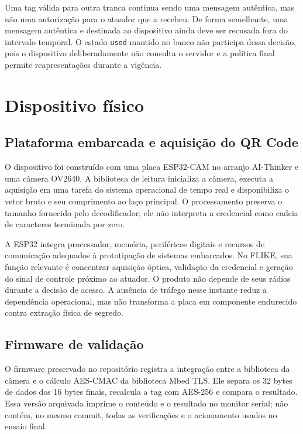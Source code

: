 Uma tag válida para outra tranca continua sendo uma mensagem autêntica, mas não uma autorização para o atuador que a recebeu. De forma semelhante, uma mensagem autêntica e destinada ao dispositivo ainda deve ser recusada fora do intervalo temporal. O estado \texttt{used} mantido no banco não participa dessa decisão, pois o dispositivo deliberadamente não consulta o servidor e a política final permite reapresentações durante a vigência.

\section{Dispositivo físico}

\subsection{Plataforma embarcada e aquisição do QR Code}

O dispositivo foi construído com uma placa ESP32-CAM no arranjo AI-Thinker e uma câmera OV2640. A biblioteca de leitura inicializa a câmera, executa a aquisição em uma tarefa do sistema operacional de tempo real e disponibiliza o vetor bruto e seu comprimento ao laço principal. O processamento preserva o tamanho fornecido pelo decodificador; ele não interpreta a credencial como cadeia de caracteres terminada por zero.

A ESP32 integra processador, memória, periféricos digitais e recursos de comunicação adequados à prototipação de sistemas embarcados. No FLIKE, sua função relevante é concentrar aquisição óptica, validação da credencial e geração do sinal de controle próximo ao atuador. O produto não depende de seus rádios durante a decisão de acesso. A ausência de tráfego nesse instante reduz a dependência operacional, mas não transforma a placa em componente endurecido contra extração física de segredo.

\subsection{Firmware de validação}

O firmware preservado no repositório registra a integração entre a biblioteca da câmera e o cálculo AES-CMAC da biblioteca Mbed TLS. Ele separa os 32 bytes de dados dos 16 bytes finais, recalcula a tag com AES-256 e compara o resultado. Essa versão arquivada imprime o conteúdo e o resultado no monitor serial; não contém, no mesmo commit, todas as verificações e o acionamento usados no ensaio final.

